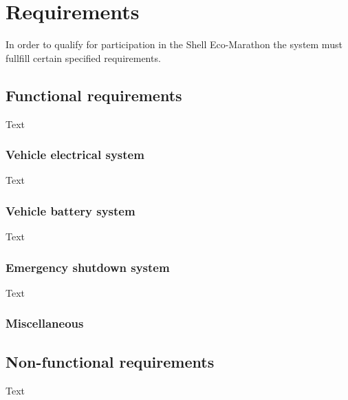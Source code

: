 \chapter{Requirements}
In order to qualify for participation in the Shell Eco-Marathon the system must fullfill certain specified requirements.



\section{Functional requirements}
Text

\subsection{Vehicle electrical system}
Text

\subsection{Vehicle battery system}
Text

\subsection{Emergency shutdown system}
Text

\subsection{Miscellaneous}

\section{Non-functional requirements}
Text